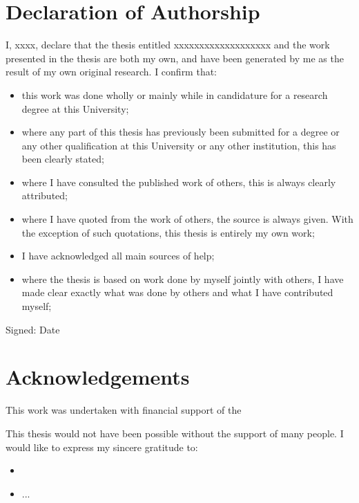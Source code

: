 \documentclass[11pt]{report}
\begin{document}
\tableofcontents
\listoffigures
{}
\listoftables
{}

\chapter*{Declaration of Authorship}
I, xxxx, declare that the thesis entitled xxxxxxxxxxxxxxxxxxx and the work presented in the thesis are both my own, and have been generated by me as the result of my own original research. I confirm that:
\begin{itemize}
\item this work was done wholly or mainly while in candidature for a research degree at this University;
\item where any part of this thesis has previously been submitted for a degree or any other qualification at this University or any other institution, this has been clearly stated;
\item where I have consulted the published work of others, this is always clearly attributed;
\item where I have quoted from the work of others, the source is always given. With the exception of such quotations, this thesis is entirely my own work;
\item I have acknowledged all main sources of help;
\item where the thesis is based on work done by myself jointly with others, I have made clear exactly what was done by others and what I have contributed myself;
\end{itemize}
\vspace{2cm}
Signed: \dotfill
\vspace{2cm}
\newline
\noindent
Date

\chapter*{Acknowledgements}
This work was undertaken with financial support of the 

This thesis would not have been possible without the support of many people. I would like to express my sincere gratitude to:
\begin{itemize}
\item 
\item ...
\end{itemize}
\end{document}
